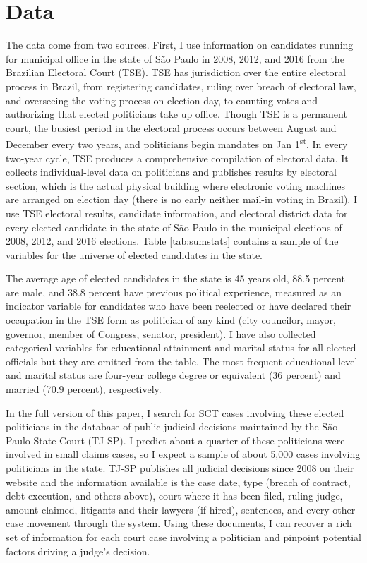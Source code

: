 \documentclass[11pt]{article}
\begin{document}
\section{Data} \label{sec:data_paper2}

The data come from two sources. First, I use information on candidates running for municipal office in the state of São Paulo in 2008, 2012, and 2016 from the Brazilian Electoral Court (TSE). TSE has jurisdiction over the entire electoral process in Brazil, from registering candidates, ruling over breach of electoral law, and overseeing the voting process on election day, to counting votes and authorizing that elected politicians take up office. Though TSE is a permanent court, the busiest period in the electoral process occurs between August and December every two years, and politicians begin mandates on Jan 1\textsuperscript{st}. In every two-year cycle, TSE produces a comprehensive compilation of electoral data. It collects individual-level data on politicians and publishes results by electoral section, which is the actual physical building where electronic voting machines are arranged on election day (there is no early neither mail-in voting in Brazil). I use TSE electoral results, candidate information, and electoral district data for every elected candidate in the state of São Paulo in the municipal elections of 2008, 2012, and 2016 elections. Table \ref{tab:sumstats} contains a sample of the variables for the universe of elected candidates in the state.



The average age of elected candidates in the state is 45 years old, 88.5 percent are male, and 38.8 percent have previous political experience, measured as an indicator variable for candidates who have been reelected or have declared their occupation in the TSE form as politician of any kind (city councilor, mayor, governor, member of Congress, senator, president). I have also collected categorical variables for educational attainment and marital status for all elected officials but they are omitted from the table. The most frequent educational level and marital status are four-year college degree or equivalent (36 percent) and married (70.9 percent), respectively.

In the full version of this paper, I search for SCT cases involving these elected politicians in the database of public judicial decisions maintained by the São Paulo State Court (TJ-SP). I predict about a quarter of these politicians were involved in small claims cases, so I expect a sample of about 5,000 cases involving politicians in the state. TJ-SP publishes all judicial decisions since 2008 on their website and the information available is the case date, type (breach of contract, debt execution, and others above), court where it has been filed, ruling judge, amount claimed, litigants and their lawyers (if hired), sentences, and every other case movement through the system. Using these documents, I can recover a rich set of information for each court case involving a politician and pinpoint potential factors driving a judge's decision.
\end{document}
